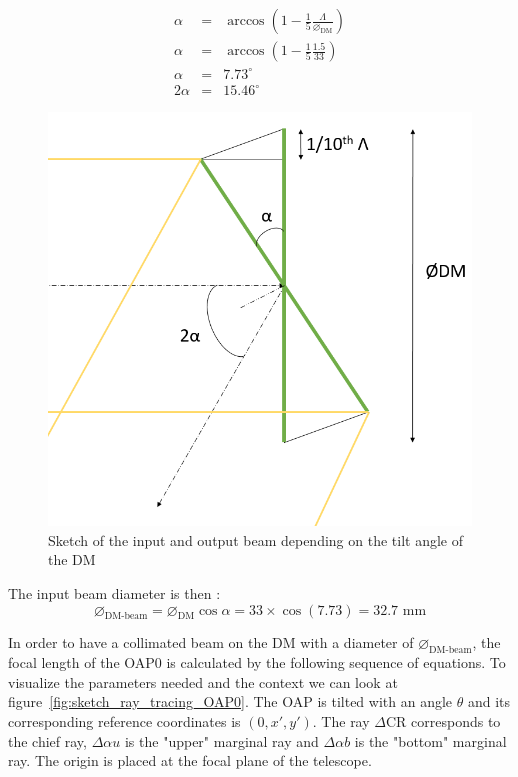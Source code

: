 \documentclass[12pt,a4paper]{article}
\begin{document}
\noindent\begin{minipage}{.45\textwidth}
\begin{eqnarray}
	\alpha &= &\arccos\left(1-\frac{1}{5}\frac{\Lambda}{\diameter_{\text{DM}}}\right)\nonumber\\
	\alpha &= &\arccos\left(1-\frac{1}{5}\frac{1.5}{33}\right)\nonumber\\
	\alpha &= &7.73^{ \circ}\label{eq:alphaDM}\\
	2\alpha &= &15.46^{ \circ}\nonumber
\end{eqnarray}
\end{minipage}
\begin{minipage}{.45\textwidth}
   \centering
   \begin{figure}[H]
	\begin{center}
		\includegraphics[width=.9\linewidth]{images/OAP0_DM_diam_beam_diam.PNG}
		\caption{Sketch of the input and output beam depending on the tilt angle of the DM}\label{fig:OAP0_DM_diam_beam_diam}
	\end{center}
\end{figure}
\end{minipage}

The input beam diameter is then :
\begin{equation}
	\diameter_{\text{DM-beam}} = \diameter_{\text{DM}} \cos{\alpha} = 33\times \cos{(7.73)} = 32.7 \text{ mm}
\end{equation}

In order to have a collimated beam on the DM with a diameter of $\diameter_{\text{DM-beam}}$, the focal length of the OAP0 is calculated by the following sequence of equations. To visualize the parameters needed and the context we can look at figure~\ref{fig:sketch_ray_tracing_OAP0}. The OAP is tilted with an angle $\theta$ and its corresponding reference coordinates is $\left(0,x',y'\right)$. The ray $\Delta$CR corresponds to the chief ray, $\Delta\alpha u$ is the "upper" marginal ray and $\Delta\alpha b$ is the "bottom" marginal ray. The origin is placed at the focal plane of the telescope.
\end{document}
